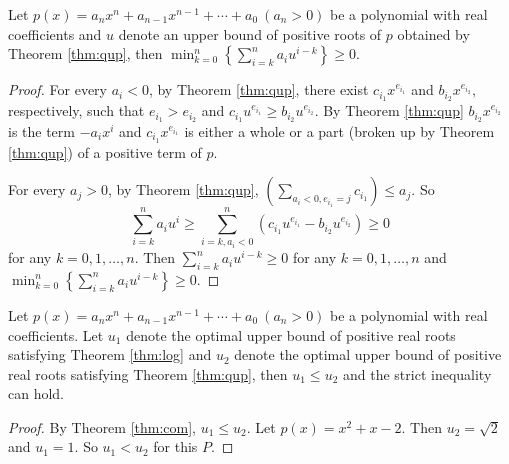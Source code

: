 \begin{theorem}\label{thm:com}
	Let $p(x)=a_nx^n+a_{n-1}x^{n-1}+\cdots+a_0\ (a_n>0)$ be a polynomial with real coefficients and   $u$ denote an upper bound of positive roots of $p$ obtained by Theorem \ref{thm:qup}, then $\min_{k=0}^{n}\left\{  \sum_{i=k}^n a_i u^{i-k}\right\}\ge0$.
	
\end{theorem}

\begin{proof}
	
	For every $ a_i<0$, by Theorem \ref{thm:qup}, there exist  $c_{i_1}x^{e_{i_1}}$ and $b_{i_2}x^{e_{i_2}},$  respectively, such that
	$e_{i_1}>e_{i_2}$ and $c_{i_1}u^{e_{i_1}}\ge b_{i_2}u^{e_{i_2}}$. By  Theorem \ref{thm:qup} $b_{i_2}x^{e_{i_2} }$ is the term $-a_ix^i$
	and $c_{i_1}x^{e_{i_1} }$ is either a whole or a part (broken up by Theorem \ref{thm:qup}) of a positive term of $p$.
	
	For every  $a_j>0$, by Theorem \ref{thm:qup}, $\left( \sum_{a_i<0,e_{i_1}=j }c_{i_1} \right)\le a_{j}$. So \begin{dmath*}\sum_{i=k}^na_iu^i\ge \sum_{i=k,a_i<0}^n \left( c_{i_1}u^{e_{i_1}}-
		b_{i_2}u^{e_{i_2}} \right)\ge 0 \end{dmath*} for any $k= 0,1,\ldots,n$. Then $\sum_{i=k}^n a_i u^{i-k}\ge0 $ for any  $k= 0,1,\ldots,n$ and
	$\min_{k=0}^{n}\left\{  \sum_{i=k}^n a_i u^{i-k}\right\}\ge0$.
\end{proof}

\begin{theorem}\label{thm:com1}
	
	Let $p(x)=a_nx^n+a_{n-1}x^{n-1}+\cdots+a_0\ (a_n>0)$ be a polynomial with real coefficients. Let  $u_1$ denote the optimal upper bound of
	positive real roots satisfying Theorem \ref{thm:log} and $u_2$ denote the optimal upper bound of positive real roots satisfying Theorem \ref{thm:qup}, then $u_1\le u_2$ and the  strict inequality can hold.
\end{theorem}

\begin{proof}
	By Theorem \ref{thm:com}, $u_1\le u_2$.
	Let $p(x)=x^2+x-2$. Then $u_2=\sqrt{2}$ and $u_1=1$. So
	$u_1<u_2$ for this $P$.
\end{proof}




